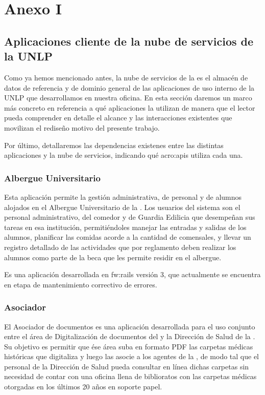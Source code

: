 \section{Anexo I}
\label{anexo:detalle-clientes}

\subsection{Aplicaciones cliente de la nube de servicios de la UNLP}

Como ya hemos mencionado antes, la nube de servicios de la {\unlp} es el almacén de datos de referencia y de dominio general de las aplicaciones de uso interno de la UNLP que desarrollamos en nuestra oficina. En esta sección daremos un marco más concreto en referencia a qué aplicaciones la utilizan de manera que el lector pueda comprender en detalle el alcance y las interacciones existentes que movilizan el rediseño motivo del presente trabajo.

Por último, detallaremos las dependencias existenes entre las distintas aplicaciones y la nube de servicios, indicando qué \glspl{acro:api} utiliza cada una.


\subsubsection{Albergue Universitario}
\label{anexo:detalle-clientes:albergue}

Esta aplicación permite la gestión administrativa, de personal y de alumnos alojados en el Albergue Universitario de la {\unlp}. Los usuarios del sistema son el personal administrativo, del comedor y de Guardia Edilicia que desempeñan sus tareas en esa institución, permitiéndoles manejar las entradas y salidas de los alumnos, planificar las comidas acorde a la cantidad de comensales, y llevar un registro detallado de las actividades que por reglamento deben realizar los alumnos como parte de la beca que les permite residir en el albergue.

Es una aplicación desarrollada en \gls{fw:rails} versión 3, que actualmente se encuentra en etapa de mantenimiento correctivo de errores.


\subsubsection{Asociador}
\label{anexo:detalle-clientes:asociador}

El Asociador de documentos es una aplicación desarrollada para el uso conjunto entre el área de Digitalización de documentos del {\cespi} y la Dirección de Salud de la {\unlp}. Su objetivo es permitir que ése área suba en formato PDF las carpetas médicas históricas que digitaliza y luego las asocie a los agentes de la {\unlp}, de modo tal que el personal de la Dirección de Salud pueda consultar en línea dichas carpetas sin necesidad de contar con una oficina llena de biblioratos con las carpetas médicas otorgadas en los últimos 20 años en soporte papel.

